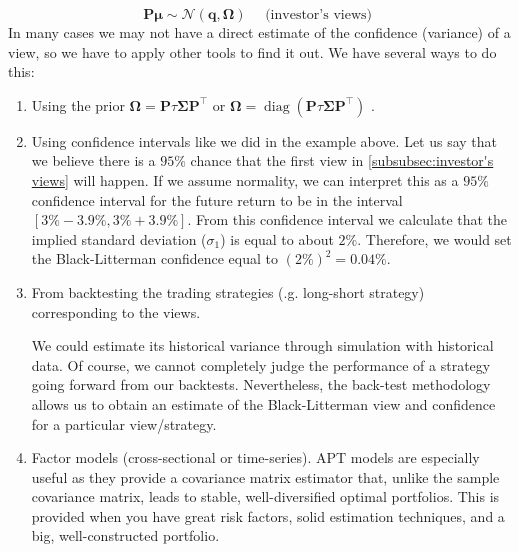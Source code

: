 \documentclass[13pt]{article}
\theoremstyle{definition}
\theoremstyle{remark}
\newenvironment{remark}
  {\pushQED{\qed}\renewcommand{\qedsymbol}{$\triangle$}\remarkx}
  {\popQED\endremarkx}
\begin{document}
$$
\mathbf{P} \bm{\mu} \sim \mathcal{N}(\bm{q}, \mathbf{\Omega}) \quad \text { (investor's views) }
$$
In many cases we may not have a direct estimate of the confidence (variance) of a view, so we have to apply other tools to find it out. We have several ways to do this:
\begin{enumerate}
    \item Using the prior $\mathbf{\Omega}=\mathbf{P} \tau \mathbf{\Sigma} \mathbf{P}^{\top}$ or  $\mathbf{\Omega}=\operatorname{diag}\left(\mathbf{P} \tau \mathbf{\Sigma} \mathbf{P}^{\top}\right)$ .
    \item Using confidence intervals like we did in the example above.
    \begin{remark}
        Let us say that we believe there is a $95\%$ chance that the first view in \cref{subsubsec:investor's views} will happen. If we assume normality, we can interpret this as a $95\%$ confidence interval for the future return to be in the interval $[3\%-3.9\%, 3\%+3.9\%]$. From this confidence interval we calculate that the implied standard deviation ($\sigma_1$) is equal to about $2\%$. Therefore, we would set the Black-Litterman confidence equal to $(2\%)^2 = 0.04\%$.
    \end{remark}
    \item From backtesting the trading strategies (.g. long-short strategy) corresponding to the views.

    \begin{remark}We could estimate its historical variance through simulation with historical data. Of course, we cannot completely judge the performance of a strategy going forward from our backtests. Nevertheless, the back-test methodology allows us to obtain an estimate of the Black-Litterman view and confidence for a particular view/strategy.
    \end{remark}
    
    \item Factor models (cross-sectional or time-series).
    \begin{remark}
        APT models are especially useful as they provide a covariance matrix estimator that, unlike the sample covariance matrix, leads to stable, well-diversified optimal portfolios. This is provided when you have great risk factors, solid estimation techniques, and a big, well-constructed portfolio.
    \end{remark}
\end{enumerate}
\end{document}
